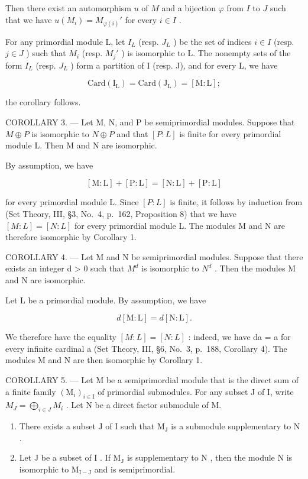 Then there exist an automorphism \(u\) of \(M\) and a bijection \(\varphi\) from \(I\) to \(J\) such that we have \(u(M_i) = M_{\varphi(i)}'\) for every \(i \in I\) .

For any primordial module L, let \(I_{L}\) (resp. \(J_{L}\) ) be the set of indices \(i \in I\) (resp. \(j \in J\) ) such that \(M_{i}\) (resp. \(M_{j}'\) ) is isomorphic to L. The nonempty sets of the form \(I_{L}\) (resp. \(J_{L}\) ) form a partition of I (resp. J), and for every L, we have

\[
\mathrm{Card} (\mathrm {I_ {L}}) = \mathrm{Card} (\mathrm {J_ {L}}) = [ \mathrm{M:L} ];
\]

the corollary follows.

COROLLARY 3. --- Let M, N, and P be semiprimordial modules. Suppose that \(M \oplus P\) is isomorphic to \(N \oplus P\) and that \([P : L]\) is finite for every primordial module L. Then M and N are isomorphic.

By assumption, we have

\[
[ \mathrm{M}: \mathrm{L} ] + [ \mathrm{P}: \mathrm{L} ] = [ \mathrm{N}: \mathrm{L} ] + [ \mathrm{P}: \mathrm{L} ]
\]

for every primordial module L. Since \([P:L]\) is finite, it follows by induction from (Set Theory, III, §3, No.~4, p.~162, Proposition 8) that we have \([M:L]=[N:L]\) for every primordial module L. The modules M and N are therefore isomorphic by Corollary 1.

COROLLARY 4. --- Let M and N be semiprimordial modules. Suppose that there exists an integer d \textgreater{} 0 such that \(M^{d}\) is isomorphic to \(N^{d}\) . Then the modules M and N are isomorphic.

Let \(\mathrm{L}\) be a primordial module. By assumption, we have

\[
d [ \mathrm{M}: \mathrm{L} ] = d [ \mathrm{N}: \mathrm{L} ].
\]

We therefore have the equality \([M:L]=[N:L]\) : indeed, we have da = a for every infinite cardinal a (Set Theory, III, §6, No.~3, p.~188, Corollary 4). The modules M and N are then isomorphic by Corollary 1.

COROLLARY 5. --- Let M be a semiprimordial module that is the direct sum of a finite family \((\mathrm{M}_{i})_{i\in\mathrm{I}}\) of primordial submodules. For any subset J of I, write \(M_{J}=\bigoplus_{i\in J}M_{i}\) . Let N be a direct factor submodule of M.

\begin{enumerate}
\def\labelenumi{\alph{enumi})}
\item
  There exists a subset \(\mathrm{J}\) of \(\mathrm{I}\) such that \(\mathrm{M}_{\mathrm{J}}\) is a submodule supplementary to \(\mathrm{N}\) .
\item
  Let \(\mathrm{J}\) be a subset of \(\mathrm{I}\) . If \(\mathrm{M}_{\mathrm{J}}\) is supplementary to \(\mathrm{N}\) , then the module \(\mathrm{N}\) is isomorphic to \(\mathrm{M}_{\mathrm{I - J}}\) and is semiprimordial.
\end{enumerate}

